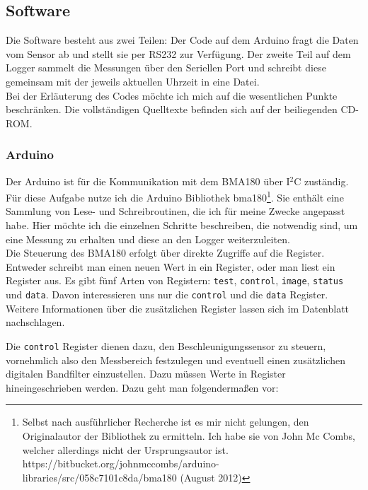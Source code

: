 \documentclass[12pt,a4paper,twoside,BCOR=12.5mm]{scrartcl}
\begin{document}
\subsection{Software} 

Die Software besteht aus zwei Teilen: Der Code auf dem Arduino fragt die Daten vom Sensor ab und stellt sie per RS232 zur Verfügung. Der zweite Teil auf dem Logger sammelt die Messungen über den Seriellen Port und schreibt diese gemeinsam mit der jeweils aktuellen Uhrzeit in eine Datei.\\

Bei der Erläuterung des Codes möchte ich mich auf die wesentlichen Punkte beschränken. Die vollständigen Quelltexte befinden sich auf der beiliegenden CD-ROM.

\subsubsection{Arduino}

Der Arduino ist für die Kommunikation mit dem BMA180 über I$^2$C zuständig. Für diese Aufgabe nutze ich die Arduino Bibliothek bma180\footnote{Selbst nach ausführlicher Recherche ist es mir nicht gelungen, den Originalautor der Bibliothek zu ermitteln. Ich habe sie von John Mc Combs, welcher allerdings nicht der Ursprungsautor ist. \\ https://bitbucket.org/johnmccombs/arduino-libraries/src/058c7101c8da/bma180 (August 2012)}. Sie enthält eine Sammlung von Lese- und Schreibroutinen, die ich für meine Zwecke angepasst habe.
Hier möchte ich die einzelnen Schritte beschreiben, die notwendig sind, um eine Messung zu erhalten und diese an den Logger weiterzuleiten. \\

Die Steuerung des BMA180 erfolgt über direkte Zugriffe auf die Register. Entweder schreibt man einen neuen Wert in ein Register, oder man liest ein Register aus. Es gibt fünf Arten von Registern: \texttt{test}, \texttt{control}, \texttt{image}, \texttt{status} und \texttt{data}.
Davon interessieren uns nur die \texttt{control} und die \texttt{data} Register. Weitere Informationen über die zusätzlichen Register lassen sich im Datenblatt \citep{Sensortec:2009rt} nachschlagen.

Die \texttt{control} Register dienen dazu, den Beschleunigungssensor zu steuern, vornehmlich also den Messbereich festzulegen und eventuell einen zusätzlichen digitalen Bandfilter einzustellen. Dazu müssen Werte in Register hineingeschrieben werden. Dazu geht man folgendermaßen vor:\\
\end{document}
